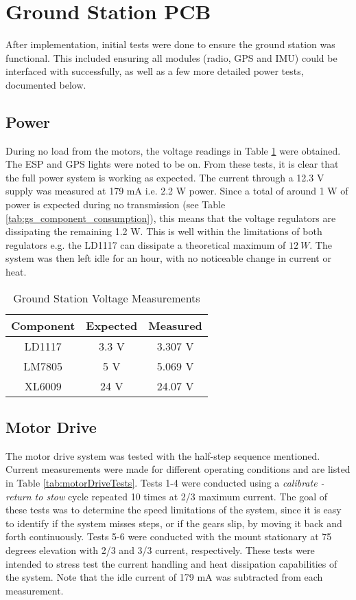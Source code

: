 \section{Ground Station PCB}

After implementation, initial tests were done to ensure the ground station was functional. This included ensuring all modules (radio, GPS and IMU) could be interfaced with successfully, as well as a few more detailed power tests, documented below.

\subsection{Power}

During no load from the motors, the voltage readings in Table \ref{tab:gs_pcb_voltage} were obtained. The ESP and GPS lights were noted to be on. From these tests, it is clear that the full power system is working as expected. The current through a 12.3 V supply was measured at 179 mA i.e. 2.2 W power. Since a total of around 1 W of power is expected during no transmission (see Table \ref{tab:gs_component_consumption}), this means that the voltage regulators are dissipating the remaining 1.2 W. This is well within the limitations of both regulators e.g. the LD1117 can dissipate a theoretical maximum of $\SI{12}{W}$. The system was then left idle for an hour, with no noticeable change in current or heat.
\begin{table}[!htb]
  \centering
  \renewcommand{\arraystretch}{1.2}
  \begin{tabular}{ |c|c|c| }
  \hline
  \textbf{Component}        & \textbf{Expected}     & \textbf{Measured}  \\
  \hline
  LD1117                 &  3.3 V             & 3.307 V \\  \hline
  LM7805                 &  5 V               & 5.069 V \\  \hline
  XL6009                 &  24 V             & 24.07 V  \\ \hline
  \end{tabular}
  \caption{Ground Station Voltage Measurements}
  \label{tab:gs_pcb_voltage}
\end{table}

\subsection{Motor Drive}
The motor drive system was tested with the half-step sequence mentioned. Current measurements were made for different operating conditions and are listed in Table \ref{tab:motorDriveTests}. Tests 1-4 were conducted using a \textit{calibrate - return to stow} cycle repeated 10 times at 2/3 maximum current. The goal of these tests was to determine the speed limitations of the system, since it is easy to identify if the system misses steps, or if the gears slip, by moving it back and forth continuously. Tests 5-6 were conducted with the mount stationary at 75 degrees elevation with 2/3 and 3/3 current, respectively. These tests were intended to stress test the current handling and heat dissipation capabilities of the system. Note that the idle current of 179 mA was subtracted from each measurement.

